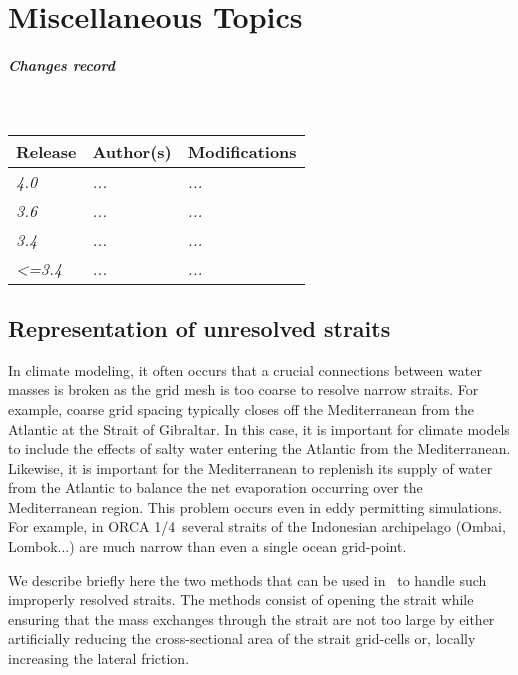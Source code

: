 \documentclass[../main/NEMO_manual]{subfiles}
\begin{document}
\chapter{Miscellaneous Topics}
\label{chap:MISC}

\thispagestyle{plain}

\chaptertoc

\paragraph{Changes record} ~\\

{\footnotesize
  \begin{tabularx}{\textwidth}{l||X|X}
    Release & Author(s) & Modifications \\
    \hline
    {\em   4.0} & {\em ...} & {\em ...} \\
    {\em   3.6} & {\em ...} & {\em ...} \\
    {\em   3.4} & {\em ...} & {\em ...} \\
    {\em <=3.4} & {\em ...} & {\em ...}
  \end{tabularx}
}

\clearpage

\section{Representation of unresolved straits}
\label{sec:MISC_strait}

In climate modeling, it often occurs that a crucial connections between water masses is broken as
the grid mesh is too coarse to resolve narrow straits.
For example, coarse grid spacing typically closes off the Mediterranean from the Atlantic at
the Strait of Gibraltar.
In this case, it is important for climate models to include the effects of salty water entering the Atlantic from
the Mediterranean.
Likewise, it is important for the Mediterranean to replenish its supply of water from the Atlantic to
balance the net evaporation occurring over the Mediterranean region.
This problem occurs even in eddy permitting simulations.
For example, in ORCA 1/4\deg\ several straits of the Indonesian archipelago (Ombai, Lombok...)
are much narrow than even a single ocean grid-point.

We describe briefly here the two methods that can be used in \NEMO\ to handle such
improperly resolved straits. The methods consist of opening the strait while ensuring
that the mass exchanges through the strait are not too large by either artificially
reducing the cross-sectional area of the strait grid-cells or, locally increasing the
lateral friction.
\end{document}
